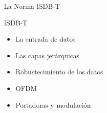 \begin{frame}{La Norma ISDB-T}
	\begin{block}{ISDB-T}
	\begin{itemize}	
		\item {	La entrada de datos}
		\item { Las capas jerárquicas}
		\item {	Robustecimiento de los datos}
		\item { OFDM }
		\item {Portadoras y modulación}
		\
	\end{itemize}
\end{block}
\end{frame}

